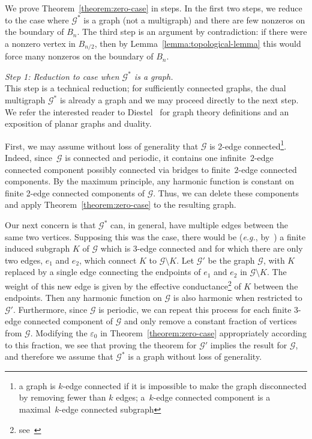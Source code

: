 \documentclass[10pt]{article}
\newcommand{\G}{\mathcal{G}}
\newcommand{\eps}{\varepsilon}
\newcommand{\eg}{{\it e.g.}}
\begin{document}
We prove Theorem~\ref{theorem:zero-case} in steps. In the first two steps, we reduce to the case where $\G^*$ is a graph (not a multigraph) and there are few nonzeros on the boundary of $B_n$. The third step is an argument by contradiction: if there were a nonzero vertex in $B_{n/2}$, then by Lemma~\ref{lemma:topological-lemma} this would force many nonzeros on the boundary of $B_{n}$.
\smallskip

{\it Step 1: Reduction to case when $\G^*$ is a graph.} \\
This step is a technical reduction; for sufficiently connected graphs, the dual multigraph $\G^*$ is already a graph and we may proceed directly to the next step. We refer the interested reader to Diestel~\cite[Section 4.6]{diestel2017graph} for graph theory definitions and an exposition of planar graphs and duality.


First, we may assume without loss of generality that $\G$ is 2-edge connected\footnote{a graph is $k$-edge connected if it is impossible to make the graph disconnected by removing fewer than $k$ edges; a~$k$-edge connected component is a maximal~$k$-edge connected subgraph}. Indeed, since~$\G$ is connected and periodic, it contains one infinite~$2$-edge connected component
possibly connected via bridges to finite~$2$-edge connected components.   
By the maximum principle, any harmonic function is constant on finite 2-edge connected components of $\G$. Thus, we can delete these components and apply Theorem~\ref{theorem:zero-case} to the resulting graph.

Our next concern is that $\G^*$ can, in general, have multiple edges between the same two vertices. Supposing this was the case, there would be (\eg, by~\cite[Proposition 4.6.2]{diestel2017graph}) a finite induced subgraph $K$ of $\G$ which is 3-edge connected
and for which there are only two edges, $e_1$ and $e_2$, which connect $K$ to $\G \setminus K$. Let $\G'$ be the graph $\G$, with $K$ replaced by a single edge connecting the endpoints of $e_1$ and $e_2$ in $\G \setminus K$. The weight of this new edge is given by the effective conductance\footnote{see~\cite[Section 3.4]{Doyle_Snell_1984}} of $K$ between the endpoints. Then any harmonic function on $\G$ is also harmonic when restricted to $\G'$. Furthermore, since $\G$ is periodic, we can repeat this process for each finite 3-edge connected component of $\G$ and only remove a constant fraction of vertices from $\G$. Modifying the $\eps_0$ in Theorem~\ref{theorem:zero-case} appropriately according to this fraction, we see that proving the theorem for $\G'$ implies the result for $\G$, and therefore we assume that $\G^*$ is a graph without loss of generality.
\smallskip
\end{document}
